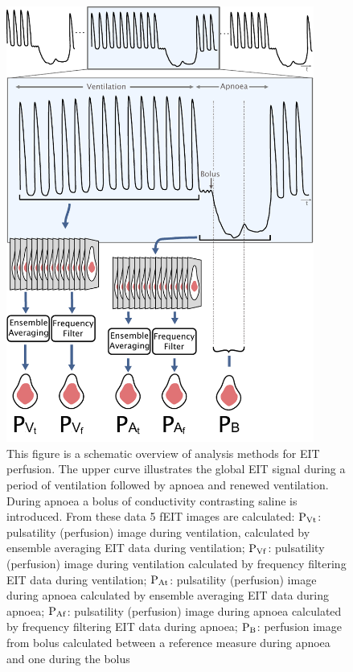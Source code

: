 \begin{figure}[H]
\centering
\includegraphics[width=0.9\textwidth]{chapter3-perfusion_analysis/imgs/fig-methodsOverview.pdf}
\caption[Overview of the EIT analysis methods]{
This figure is a schematic overview of analysis methods for EIT perfusion. 
The upper
curve illustrates the global EIT signal during a period of ventilation
followed by apnoea and renewed ventilation. During apnoea a bolus
of conductivity contrasting saline is introduced. From these data
5 fEIT images are calculated:
${\rm P_{Vt}}$: pulsatility (perfusion) image during ventilation, calculated
by ensemble averaging EIT data during ventilation;
${\rm P_{Vf}}$: pulsatility (perfusion) image during ventilation calculated
by frequency filtering EIT data during ventilation;
${\rm P_{At}}$: pulsatility (perfusion) image during apnoea calculated
by ensemble averaging EIT data during apnoea;
${\rm P_{Af}}$: pulsatility (perfusion) image during apnoea calculated
by frequency filtering EIT data during apnoea;
${\rm P_{B}}$: perfusion image from bolus calculated between a 
reference measure during apnoea and one during the bolus}
\label{fig:methods}%
\end{figure}

